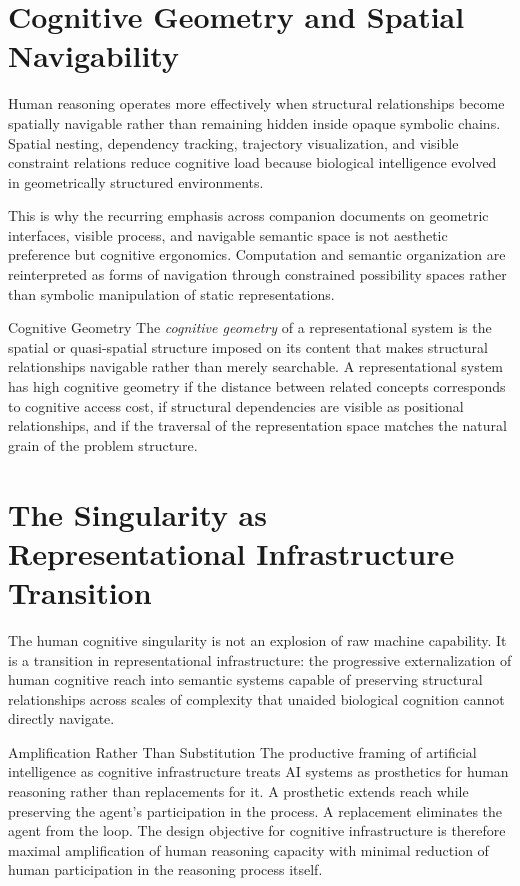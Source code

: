 \section{Cognitive Geometry and Spatial Navigability}

Human reasoning operates more effectively when structural relationships become spatially
navigable rather than remaining hidden inside opaque symbolic chains. Spatial nesting,
dependency tracking, trajectory visualization, and visible constraint relations reduce
cognitive load because biological intelligence evolved in geometrically structured
environments.

This is why the recurring emphasis across companion documents on geometric interfaces,
visible process, and navigable semantic space is not aesthetic preference but cognitive
ergonomics. Computation and semantic organization are reinterpreted as forms of
navigation through constrained possibility spaces rather than symbolic manipulation of
static representations.

\begin{definition}{Cognitive Geometry}
The \emph{cognitive geometry} of a representational system is the spatial or
quasi-spatial structure imposed on its content that makes structural relationships
navigable rather than merely searchable. A representational system has high cognitive
geometry if the distance between related concepts corresponds to cognitive access cost,
if structural dependencies are visible as positional relationships, and if the
traversal of the representation space matches the natural grain of the problem structure.
\end{definition}

\section{The Singularity as Representational Infrastructure Transition}

The human cognitive singularity is not an explosion of raw machine capability. It is a
transition in representational infrastructure: the progressive externalization of human
cognitive reach into semantic systems capable of preserving structural relationships
across scales of complexity that unaided biological cognition cannot directly navigate.

\begin{proposition}{Amplification Rather Than Substitution}
The productive framing of artificial intelligence as cognitive infrastructure treats AI
systems as prosthetics for human reasoning rather than replacements for it. A prosthetic
extends reach while preserving the agent's participation in the process. A replacement
eliminates the agent from the loop. The design objective for cognitive infrastructure
is therefore maximal amplification of human reasoning capacity with minimal reduction
of human participation in the reasoning process itself.
\end{proposition}


